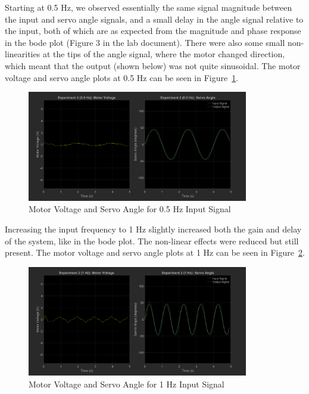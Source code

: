 \documentclass[12pt]{article}
\begin{document}
Starting at 0.5 Hz, we observed essentially the same signal magnitude between the input and servo angle signals, and a small delay in the angle signal relative to the input, both of which are as expected from the magnitude and phase response in the bode plot (Figure 3 in the lab document). There were also some small non-linearities at the tips of the angle signal, where the motor changed direction, which meant that the output (shown below) was not quite sinusoidal. The motor voltage and servo angle plots at 0.5 Hz can be seen in Figure~\ref{fig:exp2_0.5}.
\begin{figure}[h!]
    \centering
    \includegraphics[width=0.86\textwidth]{exp2_0.5}
    \caption{\label{fig:exp2_0.5}Motor Voltage and Servo Angle for 0.5 Hz Input Signal}
\end{figure}

Increasing the input frequency to 1 Hz slightly increased both the gain and delay of the system, like in the bode plot. The non-linear effects were reduced but still present. The motor voltage and servo angle plots at 1 Hz can be seen in Figure~\ref{fig:exp2_1}.
\begin{figure}[h!]
    \centering
    \includegraphics[width=0.86\textwidth]{exp2_1}
    \caption{\label{fig:exp2_1}Motor Voltage and Servo Angle for 1 Hz Input Signal}
\end{figure}
\end{document}
